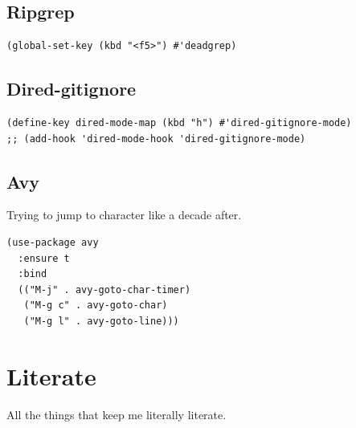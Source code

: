 \documentclass[10pt]{article}
\begin{document}
\subsection{Ripgrep}
\label{sec:orge644979}
\begin{verbatim}
(global-set-key (kbd "<f5>") #'deadgrep)
\end{verbatim}
\subsection{Dired-gitignore}
\label{sec:orge789d1c}
\begin{verbatim}
(define-key dired-mode-map (kbd "h") #'dired-gitignore-mode)
;; (add-hook 'dired-mode-hook 'dired-gitignore-mode)
\end{verbatim}
\subsection{Avy}
\label{sec:org695e10c}

Trying to jump to character like a decade after.

\begin{verbatim}
(use-package avy
  :ensure t
  :bind
  (("M-j" . avy-goto-char-timer)
   ("M-g c" . avy-goto-char)
   ("M-g l" . avy-goto-line)))
\end{verbatim}
\section{Literate}
\label{sec:org923310f}

All the things that keep me literally literate.
\end{document}

